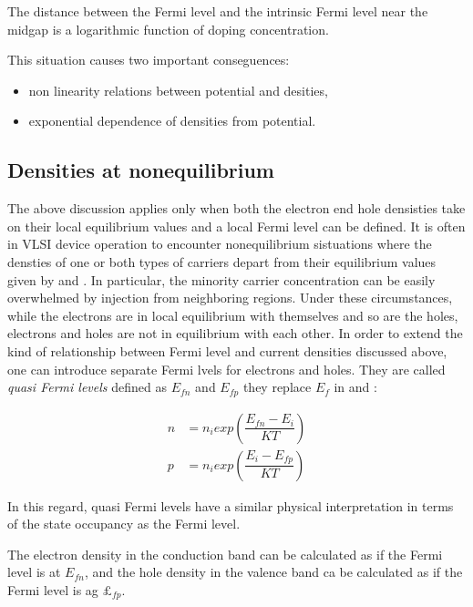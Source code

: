 \begin{Osservazione}
The distance between the Fermi level and the intrinsic Fermi level near the midgap is a logarithmic function of doping concentration.
\end{Osservazione}

This situation causes two important conseguences:
\begin{itemize}
\item non linearity relations between potential and desities,
\item exponential dependence of densities from potential.
\end{itemize}

\subsection{Densities at nonequilibrium}

The above discussion applies only when both the electron end hole densisties take on their local equilibrium values and a local Fermi level can be defined. It is often in VLSI device operation to encounter nonequilibrium sistuations where the densties of one or both types of carriers depart from their equilibrium values given by  and .
In particular, the minority carrier concentration can be easily overwhelmed by injection from neighboring regions. Under these circumstances, while the electrons are in local equilibrium with themselves and so are the holes, electrons and holes are not in equilibrium with each other. In order to extend the kind of relationship between Fermi level and current densities discussed above, one can introduce separate Fermi lvels for electrons and holes. They are called \textit{quasi Fermi levels} defined as $E_{fn}$ and $E_{fp}$ they replace $E_f$ in  and :

\begin{align}
n & = n_i exp\left(\dfrac{E_{fn}-E_i}{KT}\right) \label{eq: non eq n density mb}\\
p & = n_i exp\left(\dfrac{E_i-E_{fp}}{KT}\right)  \label{eq: non eq p density mb}
\end{align}

In this regard, quasi Fermi levels have a similar physical interpretation in terms of the state occupancy as the Fermi level.
\begin{Osservazione}
The electron density in the conduction band can be calculated as if the Fermi level is at $E_{fn}$, and the hole density in the valence band ca be calculated as if the Fermi level is ag $£_{fp}$.
\end{Osservazione}

